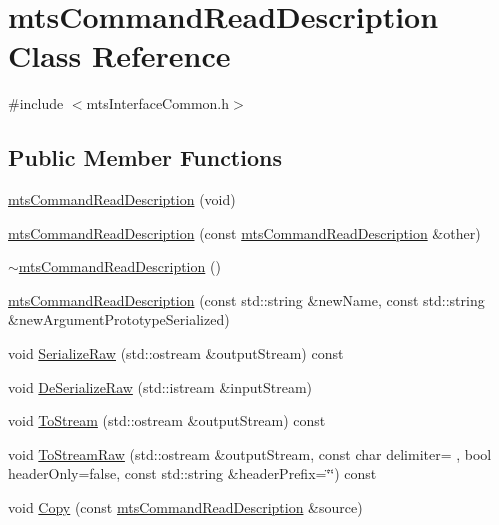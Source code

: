 \hypertarget{classmts_command_read_description}{}\section{mts\+Command\+Read\+Description Class Reference}
\label{classmts_command_read_description}


{\ttfamily \#include $<$mts\+Interface\+Common.\+h$>$}

\subsection*{Public Member Functions}
\begin{DoxyCompactItemize}
\item 
\hyperlink{classmts_command_read_description_a1e192ede6156cad51e0e9925bbe8474c}{mts\+Command\+Read\+Description} (void)
\item 
\hyperlink{classmts_command_read_description_aac30c40d2eed4a5812e16c4deb437fc2}{mts\+Command\+Read\+Description} (const \hyperlink{classmts_command_read_description}{mts\+Command\+Read\+Description} \&other)
\item 
\hyperlink{classmts_command_read_description_afb74074fb43e40393b0a09a959df95e2}{$\sim$mts\+Command\+Read\+Description} ()
\item 
\hyperlink{classmts_command_read_description_abbc0564c967a93dcdee04aa06ceb9bf0}{mts\+Command\+Read\+Description} (const std\+::string \&new\+Name, const std\+::string \&new\+Argument\+Prototype\+Serialized)
\item 
void \hyperlink{classmts_command_read_description_af3627491add99f16d30ca55cfe289716}{Serialize\+Raw} (std\+::ostream \&output\+Stream) const 
\item 
void \hyperlink{classmts_command_read_description_ac51b9d6b37a38c92404cdfb2aa3e95fd}{De\+Serialize\+Raw} (std\+::istream \&input\+Stream)
\item 
void \hyperlink{classmts_command_read_description_a8284ce2923a7b3ec0b0076f4605f9759}{To\+Stream} (std\+::ostream \&output\+Stream) const 
\item 
void \hyperlink{classmts_command_read_description_ac5a18200fab7f42aaeb1bc1ba87a8798}{To\+Stream\+Raw} (std\+::ostream \&output\+Stream, const char delimiter= \textquotesingle{} \textquotesingle{}, bool header\+Only=false, const std\+::string \&header\+Prefix=\char`\"{}\char`\"{}) const 
\item 
void \hyperlink{classmts_command_read_description_acd49530d944644f73220b4bc4c049451}{Copy} (const \hyperlink{classmts_command_read_description}{mts\+Command\+Read\+Description} \&source)

\end{DoxyCompactItemize}

